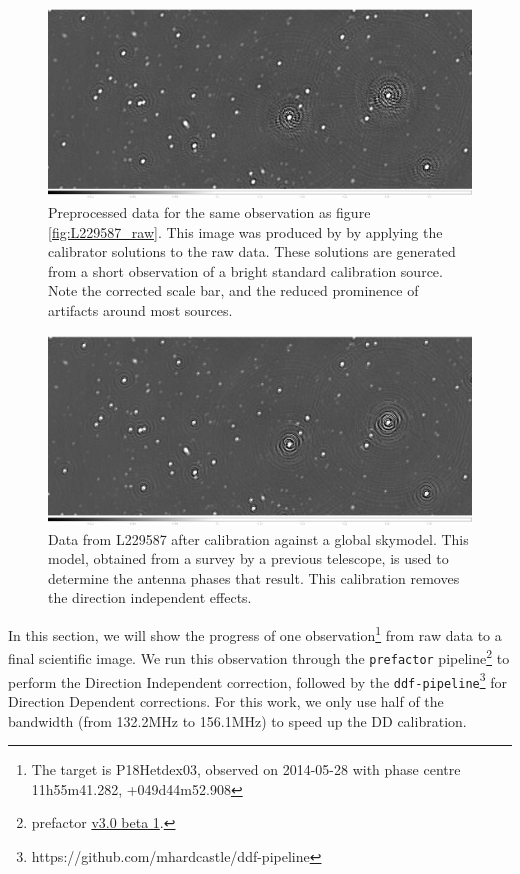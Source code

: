 \begin{figure}[!htb]
    \centering
    \includegraphics[width=.8\linewidth]{background/figures/prepcal_image_brighter.jpeg}
    \caption[Image of preprocessed data]{Preprocessed data for the same observation as figure \ref{fig:L229587_raw}. This image was produced by by applying the calibrator solutions to the raw data. These solutions are generated from a short observation of a bright standard calibration source. Note the corrected scale bar, and the reduced prominence of artifacts around most sources. }
    \label{fig:L229587_prepcal}
\end{figure}
\begin{figure}[!htb]
    \centering
    \includegraphics[width=.8\linewidth]{background/figures/final_gsmacl_brighter.jpeg}
    \caption[Image of DI calibrated data]{Data from L229587 after calibration against a global skymodel. This model, obtained from a survey by a previous telescope, is used to determine the antenna phases that result. This calibration removes the direction independent effects. }
    \label{fig:L229587_DI_cal}
\end{figure}


In this section, we will show the progress of one observation\footnote{The target is P18Hetdex03, observed on 2014-05-28 with phase centre 11h55m41.282, +049d44m52.908} from raw data to a final scientific image. We run this observation through the \texttt{prefactor} pipeline\footnote{prefactor \href{https://github.com/lofar-astron/prefactor/releases/tag/V3.0-beta1}{v3.0 beta 1}. } to perform the Direction Independent correction, followed by the \texttt{ddf-pipeline}\footnote{https://github.com/mhardcastle/ddf-pipeline} for Direction Dependent corrections. For this work, we only use half of the bandwidth (from 132.2MHz to 156.1MHz) to speed up the DD calibration.

